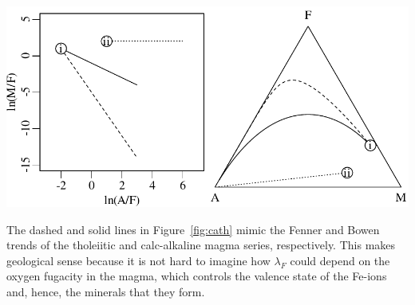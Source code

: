 \noindent\begin{minipage}[t][][b]{.7\textwidth}
\includegraphics[width=\textwidth]{../figures/cath.pdf}\medskip
\end{minipage}
\begin{minipage}[t][][t]{.3\textwidth}
  \label{fig:cath}
\end{minipage}

The dashed and solid lines in Figure~\ref{fig:cath} mimic the Fenner
and Bowen trends of the tholeiitic and calc-alkaline magma series,
respectively. This makes geological sense because it is not hard to
imagine how $\lambda_F$ could depend on the oxygen fugacity in the
magma, which controls the valence state of the Fe-ions and, hence, the
minerals that they form.
